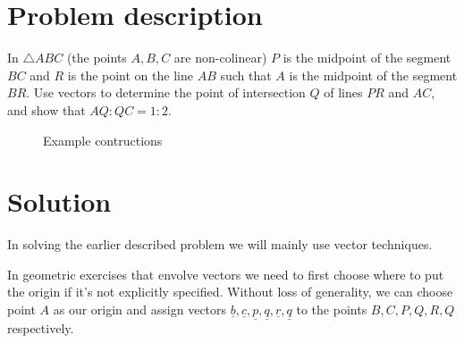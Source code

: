 \documentclass{article}
\renewcommand{\v}[1]{\underline{#1}}
\begin{document}
    
    \newpage
    \section{Problem description}
    In $ \triangle ABC$ (the points $A,B,C$ are non-colinear)
    $P$ is the midpoint of the segment $BC$ and
    $R$ is the point on the line $AB$ such that $A$
    is the midpoint of the segment $BR$. Use vectors to determine the point of intersection
    $Q$ of lines $PR$ and $AC$, and show that $AQ:QC = 1:2$.

    \begin{figure}[h]
        \begin{center}
        \end{center}
        \caption{Example contructions}
    \end{figure}

    \section{Solution}
    In solving the earlier described problem we will mainly use vector techniques.
    \par
    In geometric exercises that envolve vectors we need to first choose where to put the origin
    if it's not explicitly specified. Without loss of generality, we can choose point $A$ as our origin and assign vectors
    $\v{b}, \v{c}, \v{p}, \v{q}, \v{r}, \v{q}$ to the points
    $B, C, P, Q, R, Q$ respectively.
\end{document}
